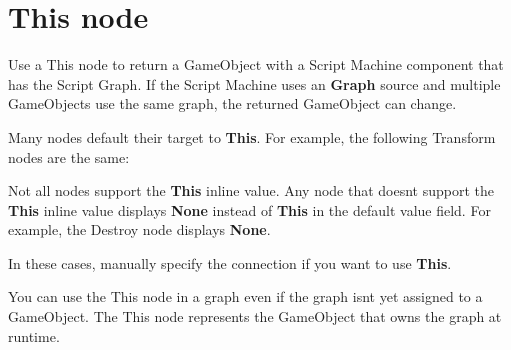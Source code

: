 \chapter{This node}
\hypertarget{md__hey_tea_9_2_library_2_package_cache_2com_8unity_8visualscripting_0d1_88_80_2_documentation_0i_2vs-self}{}\label{md__hey_tea_9_2_library_2_package_cache_2com_8unity_8visualscripting_0d1_88_80_2_documentation_0i_2vs-self}
\label{md__hey_tea_9_2_library_2_package_cache_2com_8unity_8visualscripting_0d1_88_80_2_documentation_0i_2vs-self_autotoc_md5573}%
%
 Use a This node to return a Game\+Object with a Script Machine component that has the Script Graph. If the Script Machine uses an {\bfseries{Graph}} source and multiple Game\+Objects use the same graph, the returned Game\+Object can change. ~\newline


Many nodes default their target to {\bfseries{This}}. For example, the following Transform nodes are the same\+:



Not all nodes support the {\bfseries{This}} inline value. Any node that doesn\textquotesingle{}t support the {\bfseries{This}} inline value displays {\bfseries{None}} instead of {\bfseries{This}} in the default value field. For example, the Destroy node displays {\bfseries{None}}.

In these cases, manually specify the connection if you want to use {\bfseries{This}}.



You can use the This node in a graph even if the graph isn\textquotesingle{}t yet assigned to a Game\+Object. The This node represents the Game\+Object that owns the graph at runtime. 